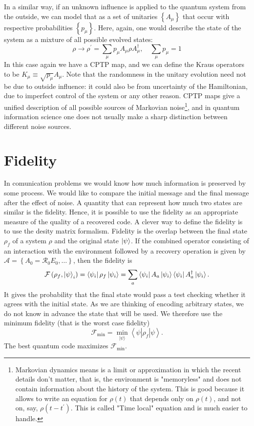 In a similar way, if an unknown influence is applied to the quantum system from the outside, we can model that as a set of unitaries $\left\{A_{\mu}\right\}$ that occur with respective probabilities $\left\{p_{\mu}\right\}$. Here, again, one would describe the state of the system as a mixture of all possible evolved states:
$$
\rho \rightarrow \rho^{\prime}=\sum_{\mu} p_{\mu} A_{\mu} \rho A_{\mu}^{\dagger}, \quad \sum_{\mu} p_{\mu}=1
$$
In this case again we have a CPTP map, and we can define the Kraus operators to be $K_{\mu} \equiv \sqrt{p_{\mu}} A_{\mu} .$ Note that the randomness in the unitary evolution need not be due to outside influence:
it could also be from uncertainty of the Hamiltonian, due to imperfect control of the system or any other reason. CPTP maps give a unified description of all possible sources of Markovian noise\footnote{ Markovian dynamics means is a limit or approximation in which the recent details don't matter, that is, the environment is "memoryless" and does not contain information about the history of the system. This is good because it allows to write an equation for $\rho(t)$ that depends only on $\rho(t)$, and not on, say, $\rho\left(t-t^{\prime}\right)$. This is called "Time local" equation and is much easier to handle.}, and in quantum information science one does not usually make a sharp distinction between different noise sources. 




\section{Fidelity}
In comunication problems we would know how much information is preserved by some process. We would like to compare the initial message and the final message after the effect of noise. 
A quantity that can represent how much two states are similar is the fidelity. 
Hence, it is possible to use the fidelity as an appropriate measure of the quality of a recovered code.
A clever way to define the fidelity is to use the desity matrix formalism.
Fidelity is the overlap between the final state $\rho_f$ of a system $\rho$ and the original state $\ket{\psi}$.
If the combined operator consisting of an interaction with the environment followed by a recovery operation is given by $\mathcal{A}=\left\{A_{0}=\mathcal{R}_0E_0, \ldots\right\}$, then the fidelity is
$$
\mathcal{F}\left(\rho_f,\ket{\psi}_i\right)=\bra{\psi_i}\rho_{f}\ket{\psi_i}=\sum_{a}\bra{\psi_i}A_{a}\ket{\psi_i}\bra{\psi_i}A_{a}^{\dagger}\ket{\psi_i} .
$$
It gives the probability that the final state would pass a test checking whether it agrees with the initial state. As we are thinking of encoding arbitrary states, we do not know in advance the state that will be used. We therefore use the minimum fidelity (that is the worst case fidelity)
\begin{equation}
\mathcal{F}_{\min }=\min _{|\psi\rangle}\left\langle\psi\left|\rho_{f}\right| \psi\right\rangle .
\end{equation}
The best quantum code maximizes $\mathcal{F}_{\min }$. 


